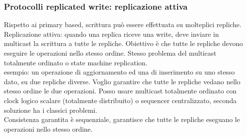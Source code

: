 \documentclass[16px]{article}
\begin{document}
\subsubsection{Protocolli replicated write: replicazione attiva}
Rispetto ai primary based, scrittura può essere effettuata su molteplici repliche.\\ Replicazione attiva: quando una replica riceve una write, deve inviare in multicast la scrittura a tutte le repliche. Obiettivo è che tutte le repliche devono eseguire le operazioni nello stesso ordine. Stesso problema del multicast totalmente ordinato o state machine replication.\\ esempio: un operazione di aggiornamento ed una di inserimento su uno stesso dato, su due repliche diverse. Voglio garantire che tutte le repliche vedano nello stesso ordine le due operazioni. Posso usare multicast totalmente ordinato con clock logico scalare (totalmente distribuito) o sequencer centralizzato, seconda soluzione ha i classici problemi.\\ Consistenza garantita è sequenziale, garantisce che tutte le repliche eseguano le operazioni nello stesso ordine.
\end{document}
